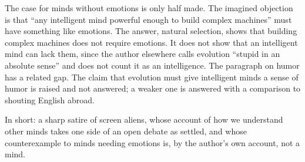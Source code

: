 \begin{afterword}
The case for minds without emotions is only half made. The imagined objection is that ``any intelligent mind powerful enough to build complex machines'' must have something like emotions. The answer, natural selection, shows that building complex machines does not require emotions. It does not show that an intelligent mind can lack them, since the author elsewhere calls evolution ``stupid in an absolute sense'' and does not count it as an intelligence. The paragraph on humor has a related gap. The claim that evolution must give intelligent minds a sense of humor is raised and not answered; a weaker one is answered with a comparison to shouting English abroad.

In short: a sharp satire of screen aliens, whose account of how we understand other minds takes one side of an open debate as settled, and whose counterexample to minds needing emotions is, by the author's own account, not a mind.
\end{afterword}
